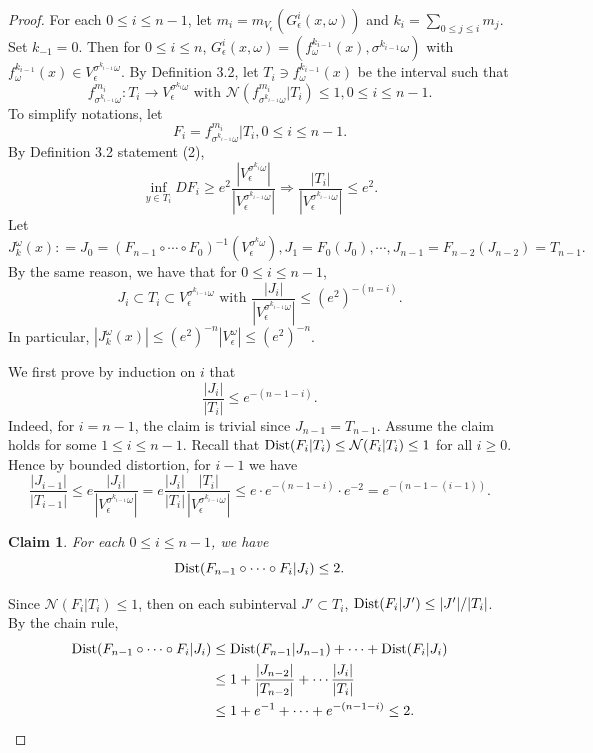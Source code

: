 \documentclass[11pt,oneside]{article}
\newtheorem*{claim}{Claim}
\theoremstyle{plain}
\numberwithin{equation}{section}
\numberwithin{figure}{section}
\numberwithin{table}{section}
\begin{document}
\begin{proof}


For each $0 \leq i \leq n-1$, let $m_i = m_{V_{\epsilon}}(G_{\epsilon}^i(x, \omega))$ and $k_i = \sum_{0 \leq j \leq i} m_j$. Set $k_{-1} = 0$. Then for $0 \leq i \leq n$, $G_{\epsilon}^i(x, \omega) = (f_{\omega}^{k_{i-1}}(x), \sigma^{k_{i-1}} \omega)$ with $f_{\omega}^{k_{i-1}}(x) \in V_{\epsilon}^{\sigma^{k_{i-1}} \omega}$. By Definition 3.2, let $T_i \ni f_{\omega}^{k_{i-1}}(x)$ be the interval such that 
\[
f_{\sigma^{k_{i-1}}\omega}^{m_i} : T_i \to V_{\epsilon}^{\sigma^{k_i} \omega} \mbox{ with \ } \mathcal N(f_{\sigma^{k_{i-1}}\omega}^{m_i} | T_i ) \leq 1, 0 \leq i \leq n-1.
\]
To simplify notations, let 
\[
F_i = f_{\sigma^{k_{i-1}}\omega}^{m_i} | T_i, 0 \leq i \leq n-1.
\]
By Definition 3.2 statement (2), 
\[
\inf_{y \in T_i} D F_i \geq e^2 \frac{|V_{\epsilon}^{\sigma^{k_i} \omega}|}{|V_{\epsilon}^{\sigma^{k_{i-1}}\omega}|} \Rightarrow \frac{|T_i|}{| V_{\epsilon}^{\sigma^{k_{i-1}}\omega}|} \leq e^2.
\]
Let 
\[
J_k^{\omega}(x) : = J_0 = (F_{n-1} \circ \cdots \circ F_0)^{-1} (V_{\epsilon}^{\sigma^k \omega}), J_1 = F_0 (J_0), \cdots, J_{n-1} = F_{n-2} (J_{n-2}) = T_{n-1}.
\]
By the same reason, we have that for $0 \leq i \leq n-1$,
\[
J_i \subset T_i \subset V_{\epsilon}^{\sigma^{k_{i-1}} \omega} \mbox{ with \ } \frac{|J_i|}{| V_{\epsilon}^{\sigma^{k_{i-1}} \omega}|} \leq (e^2)^{- (n-i)}.
\]
In particular, $|J_k^{\omega}(x)| \leq (e^2)^{-n} |V_{\epsilon}^{ \omega}| \leq (e^2)^{-n}$.


We first prove by induction on $i$ that
\[
\frac{|J_i|}{|T_i|} \leq e^{- (n - 1 - i)}.
\]
Indeed, for $i = n-1$, the claim is trivial since $J_{n-1} = T_{n-1}$. Assume the claim holds for some $1 \leq i \leq n-1$. Recall that ${\rm Dist}(F_i |T_i) \leq \mathcal N(F_i |T_i) \leq 1 $ for all $i \geq 0$. Hence by bounded distortion, for $i - 1$ we have
\[
\frac{|J_{i-1}|}{|T_{i-1}|} \leq e \frac{|J_i|}{|V_{\epsilon}^{\sigma^{k_{i-1}} \omega}|} = e \frac{|J_{i}|}{|T_i|}  \frac{|T_i|}{|V_{\epsilon}^{\sigma^{k_{i-1}} \omega}|} \leq e \cdot e^{- (n-1 -i)} \cdot e^{-2} = e^{- (n-1 -(i -1))}.
\]


\begin{claim}
For each $0 \leq i \leq n-1$, we have
\[
 {\rm Dist} (F_{n-1} \circ \cdots \circ F_i |J_i) \leq 2.
\]
\end{claim}


Since $\mathcal N(F_i |T_i) \leq 1$, then on each subinterval $J' \subset T_i$, ${\rm Dist}(F_i|J') \leq |J'|/ |T_i| $. By the chain rule, 
\begin{align*}
 {\rm Dist} (F_{n-1} \circ \cdots \circ F_i |J_i)  & \leq  {\rm Dist}(F_{n-1} |J_{n-1}) + \cdots + {\rm Dist}(F_i |J_i)  \\
 & \leq 1 + \frac{|J_{n-2}|}{|T_{n-2}|} + \cdots \frac{|J_i|}{|T_i|}  \\
 & \leq 1 + e^{-1} + \cdots + e^{-(n-1-i)} \leq 2.
\end{align*}


\end{proof}
\end{document}
